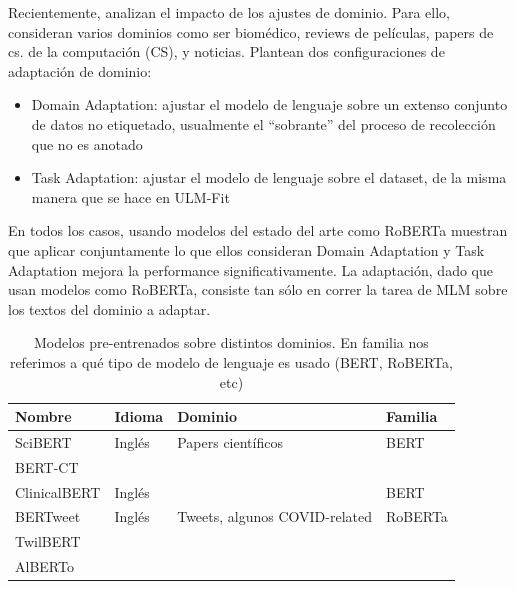 Recientemente, \citet{gururangan-etal-2020-dont} analizan el impacto de los ajustes de dominio. Para ello, consideran varios dominios como ser biomédico, reviews de películas, papers de cs. de la computación (CS), y noticias. Plantean dos configuraciones de adaptación de dominio:

\begin{itemize}
    \item Domain Adaptation: ajustar el modelo de lenguaje sobre un extenso conjunto de datos no etiquetado, usualmente el ``sobrante'' del proceso de recolección que no es anotado
    \item Task Adaptation: ajustar el modelo de lenguaje sobre el dataset, de la misma manera que se hace en ULM-Fit
\end{itemize}

En todos los casos, usando modelos del estado del arte como RoBERTa muestran que aplicar conjuntamente lo que ellos consideran Domain Adaptation y Task Adaptation mejora la performance significativamente. La adaptación, dado que usan modelos como RoBERTa, consiste tan sólo en correr la tarea de MLM sobre los textos del dominio a adaptar.

\begin{table}
    \centering
    \begin{tabular}{llll}
        Nombre                                 & Idioma            & Dominio                          & Familia     \\
        \hline
        SciBERT\cite{beltagy-etal-2019-scibert} & Inglés            & Papers científicos               & BERT        \\
        BERT-CT                                 &                   &                                  &             \\
        ClinicalBERT\cite{huang2019clinicalbert}& Inglés            &                                  & BERT        \\
        BERTweet\cite{bertweet}                 & Inglés            & Tweets, algunos COVID-related    & RoBERTa     \\
        TwilBERT                                &                   &                                  &             \\
        AlBERTo                                 &                   &                                  &             \\
    \end{tabular}

    \caption{Modelos pre-entrenados sobre distintos dominios. En familia nos referimos a qué tipo de modelo de lenguaje es usado (BERT, RoBERTa, etc)}
    \label{tab:bert_pretrained_models}
\end{table}


